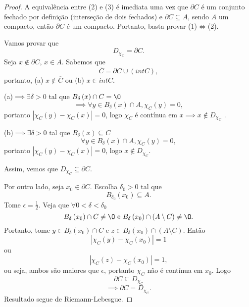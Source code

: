 \begin{proof}
    A equivalência entre (2) e (3) é imediata uma vez que $\partial C$ é um conjunto fechado por definição (interseção de dois fechados) e $\partial C \subseteq A$, sendo $A$ um compacto, então $\partial C$ é um compacto. Portanto, basta provar (1)$\iff$(2).

    Vamos provar que \[
    D_{\chi_C} = \partial C
    .\] Seja $x\not\in \partial C$, $x\in A$. Sabemos que \[
    \overline{C} = \partial C \cup \left( int C \right) 
,\] portanto, (a) $x\not\in \overline{C}$ ou (b) $x\in int C$.

(a)$\implies \exists \delta>0$ tal que $B_{\delta}\left( x \right) \cap C = \O$ \[
\implies \forall y\in B_{\delta}\left( x \right) \cap A, \chi_C\left( y \right) = 0
,\] portanto $\left| \chi_C\left( y \right) - \chi_C\left( x \right)  \right| =0$, logo $\chi_C$ é contínua em $x \implies x\not\in D_{\chi_C}$ .

(b)$\implies \exists \delta>0$ tal que $B_\delta\left( x \right) \subseteq C$ \[
\forall y\in B_\delta\left( x \right) \cap A, \chi_C\left( y \right) = 0
,\] portanto $\left| \chi_C\left( y \right) -\chi_C\left( x \right)  \right| =0$, logo $x\not\in D_{\chi_C}$.

Assim, vemos que $D_{\chi_C}\subseteq\partial C$.

Por outro lado, seja $x_0\in \partial C$. Escolha $\delta_0>0$ tal que \[
B_{\delta_0}\left( x_0 \right) \subseteq A
.\] Tome $\epsilon = \frac{1}{2}$. Veja que $\forall 0<\delta < \delta_0$\[
B_{\delta}\left( x_0 \right) \cap C \neq  \O \text{ e }B_{\delta}\left( x_0 \right) \cap \left( A\setminus C \right) \neq \O
.\] Portanto, tome $y\in B_{\delta}\left( x_0 \right) \cap C$ e $z\in B_{\delta}\left( x_0 \right) \cap \left( A\setminus C \right)$. Então \[
\left| \chi_C\left( y \right) -\chi_C\left( x_0 \right)  \right| = 1
\] ou \[
\left| \chi_C\left( z \right) -\chi_C\left( x_0 \right)  \right| = 1
,\] ou seja, ambos são maiores que $\epsilon$, portanto $\chi_C$ não é contínua em $x_0$. Logo \[
\partial C \subseteq D_{\chi_C}
\] \[
\implies \partial C = D_{\chi_C}
.\] Resultado segue de Riemann-Lebesgue.
\end{proof}

